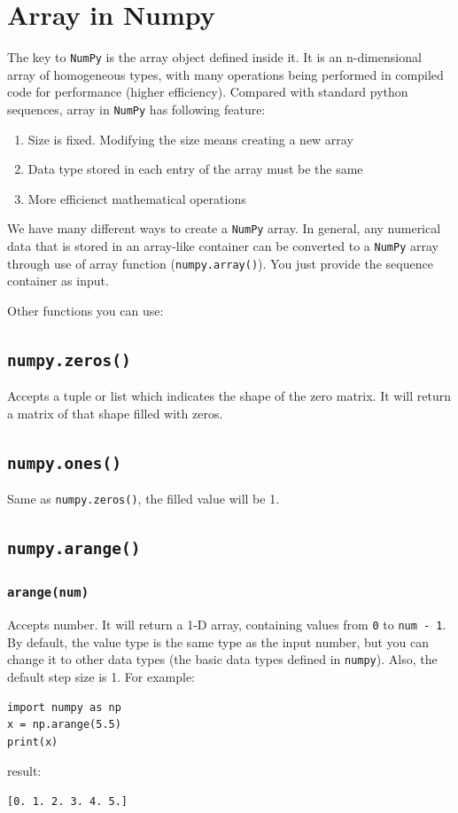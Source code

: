 \documentclass[12pt]{book}
\begin{document}
\section{Array in Numpy}
\label{sec:org756a9cb}
The key to \texttt{NumPy} is the array object defined inside it. It is an n-dimensional array of homogeneous types, with many operations being performed in compiled code for performance (higher efficiency). Compared with standard python sequences, array in \texttt{NumPy} has following feature:
\begin{enumerate}
\item Size is fixed. Modifying the size means creating a new array
\item Data type stored in each entry of the array must be the same
\item More efficienct mathematical operations
\end{enumerate}

We have many different ways to create a \texttt{NumPy} array. In general, any numerical data that is stored in an array-like container can be converted to a \texttt{NumPy} array through use of array function (\texttt{numpy.array()}). You just provide the sequence container as input.

Other functions you can use:
\subsection{\texttt{numpy.zeros()}}
\label{sec:orgc151612}
Accepts a tuple or list which indicates the shape of the zero matrix. It will return a matrix of that shape filled with zeros.
\subsection{\texttt{numpy.ones()}}
\label{sec:orgdfd505c}
Same as \texttt{numpy.zeros()}, the filled value will be 1.
\subsection{\texttt{numpy.arange()}}
\label{sec:orgd3a97ab}
\subsubsection{\texttt{arange(num)}}
\label{sec:orga008ab0}
Accepts number. It will return a 1-D array, containing values from \texttt{0} to \texttt{num - 1}. By default, the value type is the same type as the input number, but you can change it to other data types (the basic data types defined in \texttt{numpy}). Also, the default step size is 1. For example:
\begin{verbatim}
import numpy as np
x = np.arange(5.5)
print(x)
\end{verbatim}
result:
\begin{verbatim}
[0. 1. 2. 3. 4. 5.]
\end{verbatim}
\end{document}
